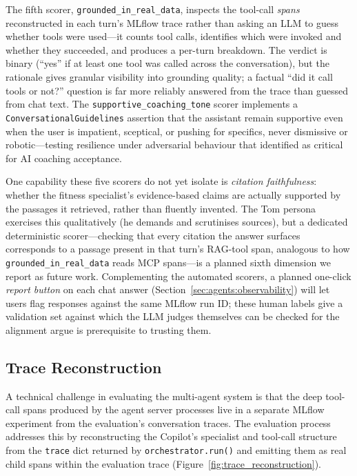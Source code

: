 

The fifth scorer, \texttt{grounded\_in\_real\_data}, inspects the tool-call \textit{spans} reconstructed in each turn's MLflow trace rather than asking an LLM to guess whether tools were used---it counts tool calls, identifies which were invoked and whether they succeeded, and produces a per-turn breakdown. The verdict is binary (``yes'' if at least one tool was called across the conversation), but the rationale gives granular visibility into grounding quality; a factual ``did it call tools or not?'' question is far more reliably answered from the trace than guessed from chat text. The \texttt{supportive\_coaching\_tone} scorer implements a \texttt{ConversationalGuidelines} assertion that the assistant remain supportive even when the user is impatient, sceptical, or pushing for specifics, never dismissive or robotic---testing resilience under adversarial behaviour that \cite{barger_artificial_2025} identified as critical for AI coaching acceptance.

One capability these five scorers do not yet isolate is \textit{citation faithfulness}: whether the fitness specialist's evidence-based claims are actually supported by the passages it retrieved, rather than fluently invented. The Tom persona exercises this qualitatively (he demands and scrutinises sources), but a dedicated deterministic scorer---checking that every citation the answer surfaces corresponds to a passage present in that turn's RAG-tool span, analogous to how \texttt{grounded\_in\_real\_data} reads MCP spans---is a planned sixth dimension we report as future work. Complementing the automated scorers, a planned one-click \textit{report button} on each chat answer (Section~\ref{sec:agents:observability}) will let users flag responses against the same MLflow run ID; these human labels give a validation set against which the LLM judges themselves can be checked for the alignment \cite{shankar_validates_2024} argue is prerequisite to trusting them.

\subsection{Trace Reconstruction}\label{sec:evaluation:trace}

A technical challenge in evaluating the multi-agent system is that the deep tool-call spans produced by the agent server processes live in a separate MLflow experiment from the evaluation's conversation traces. The evaluation process addresses this by reconstructing the Copilot's specialist and tool-call structure from the \texttt{trace} dict returned by \texttt{orchestrator.run()} and emitting them as real child spans within the evaluation trace (Figure~\ref{fig:trace_reconstruction}).

